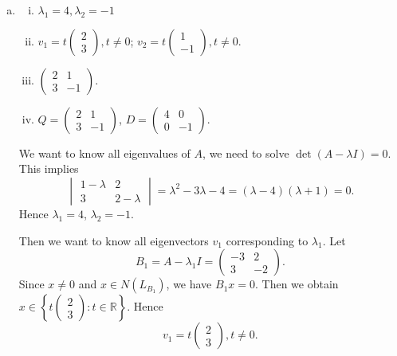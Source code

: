 \begin{Exercise}
	\begin{enumerate}[(a)]
		\item
		\begin{answer}
			\begin{enumerate}[(i)]
				\item $\lambda_1 = 4, \lambda_2 = -1$
				
				\item $v_1 = t\begin{pmatrix}
				2 \\
				3
				\end{pmatrix}, t\neq 0$; $v_2=t\begin{pmatrix}
				1 \\
				-1
				\end{pmatrix}, t\neq 0$.
				
				\item $\begin{pmatrix}
				2 & 1 \\
				3 & -1
				\end{pmatrix}$.
				
				\item $Q = \begin{pmatrix}
				2 & 1 \\
				3 & -1
				\end{pmatrix}$, $D = \begin{pmatrix}
				4 & 0 \\
				0 & -1
				\end{pmatrix}$.
			\end{enumerate}
		\end{answer}
		\begin{solution}
			We want to know all eigenvalues of $A$, we need to solve $\det(A-\lambda I) = 0$. This implies
			$$
			\begin{vmatrix}
			1-\lambda & 2 \\
			3 & 2-\lambda
			\end{vmatrix} =  \lambda^2 -3\lambda - 4
			= (\lambda-4)(\lambda+1)
			= 0.
			$$
			Hence $\lambda_1 = 4$, $\lambda_2 = -1$.
			
			Then we want to know all eigenvectors $v_1$ corresponding to $\lambda_1$. Let
			$$
			B_1 = A-\lambda_1 I = \begin{pmatrix}
			-3 & 2 \\
			3 & -2
			\end{pmatrix}.
			$$
			Since $x\neq 0$ and $x\in N(L_{B_1})$, we have $B_1 x = 0$. Then we obtain $x \in \left\{t\begin{pmatrix}
			2 \\
			3
			\end{pmatrix}:t\in\mathbb{R}\right\}$. Hence
			$$
			v_1 = t\begin{pmatrix}
			2 \\
			3
			\end{pmatrix}, t\neq 0.
			$$
			

\end{solution}
\end{enumerate}
\end{Exercise}
